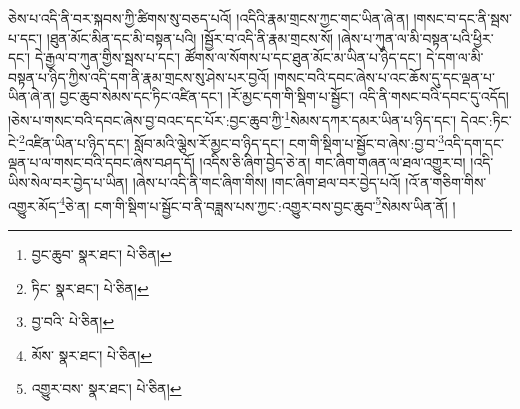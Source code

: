 ཅེས་པ་འདི་ནི་བར་སྐབས་ཀྱི་ཚིགས་སུ་བཅད་པའོ། །འདིའི་རྣམ་གྲངས་ཀྱང་གང་ཡིན་ཞེ་ན། །གསང་བ་དང་ནི་སྦས་པ་དང་། །ཐུན་མོང་མིན་དང་མི་བསྟན་པའི། །སྦྱོར་བ་འདི་ནི་རྣམ་གྲངས་སོ། །ཞེས་པ་ཀུན་ལ་མི་བསྟན་པའི་ཕྱིར་དང་། དེ་རྒྱལ་བ་ཀུན་གྱིས་སྦས་པ་དང་། ཚོགས་ལ་སོགས་པ་དང་ཐུན་མོང་མ་ཡིན་པ་ཉིད་དང་། དེ་དག་ལ་མི་བསྟན་པ་ཉིད་ཀྱིས་འདི་དག་ནི་རྣམ་གྲངས་སུ་ཤེས་པར་བྱའོ། །གསང་བའི་དབང་ཞེས་པ་འང་ཆོས་དུ་དང་ལྡན་པ་ཡིན་ཞེ་ན། བྱང་ཆུབ་སེམས་དང་ཏིང་འཛིན་དང་། །རོ་མྱང་དག་གི་སྡིག་པ་སྦྱོང་། འདི་ནི་གསང་བའི་དབང་དུ་འདོད། །ཅེས་པ་གསང་བའི་དབང་ཞེས་བྱ་བའང་དང་པོར་:བྱང་ཆུབ་ཀྱི་\footnote{བྱང་ཆུབ་  སྣར་ཐང་།  པེ་ཅིན། }སེམས་དཀར་དམར་ཡིན་པ་ཉིད་དང་། དེའང་:ཏིང་ངེ་\footnote{ཏིང་  སྣར་ཐང་།  པེ་ཅིན། }འཛིན་ཡིན་པ་ཉིད་དང་། སློབ་མའི་ལྕེས་རོ་མྱང་བ་ཉིད་དང་། ངག་གི་སྡིག་པ་སྦྱོང་བ་ཞེས་:བྱ་བ་\footnote{བྱ་བའི་  པེ་ཅིན། }འདི་དག་དང་ལྡན་པ་ལ་གསང་བའི་དབང་ཞེས་བཤད་དོ། །འདིས་ཅི་ཞིག་བྱེད་ཅེ་ན། གང་ཞིག་གཞན་ལ་ཐལ་འགྱུར་བ། །འདི་ཡིས་སེལ་བར་བྱེད་པ་ཡིན། །ཞེས་པ་འདི་ནི་གང་ཞིག་གིས། །གང་ཞིག་ཐལ་བར་བྱེད་པའོ། །འོ་ན་གཅིག་གིས་འགྱུར་མོད་\footnote{མོས་  སྣར་ཐང་།  པེ་ཅིན། }ཅེ་ན། ངག་གི་སྡིག་པ་སྦྱོང་བ་ནི་བཟླས་པས་ཀྱང་:འགྱུར་བས་བྱང་ཆུབ་\footnote{འགྱུར་བས་  སྣར་ཐང་།  པེ་ཅིན། }སེམས་ཡིན་ནོ། །
